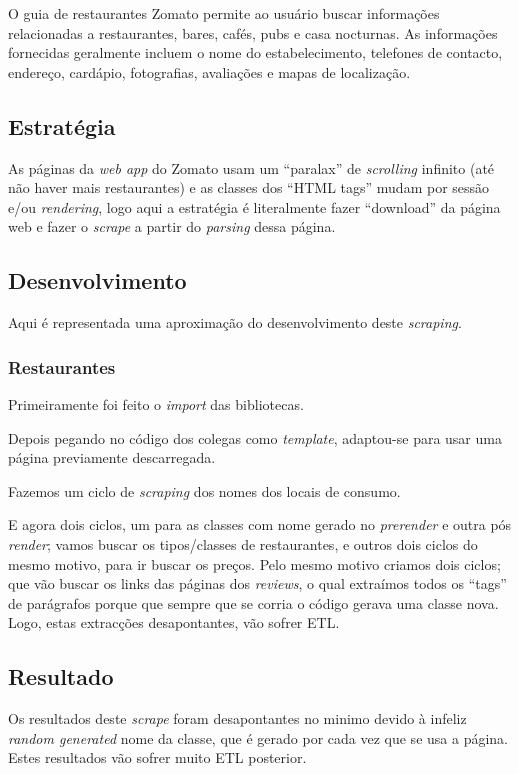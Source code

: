 O guia de restaurantes Zomato permite ao usuário buscar informações relacionadas a restaurantes, bares, cafés, pubs e casa nocturnas. As informações fornecidas geralmente incluem o nome do estabelecimento, telefones de contacto, endereço, cardápio, fotografias, avaliações e mapas de localização.

\subsection{Estratégia}
As páginas da \textit{web app} do Zomato usam um ``paralax'' de \textit{scrolling} infinito (até não haver mais restaurantes) e as classes dos ``HTML tags'' mudam por sessão e/ou \textit{rendering}, logo aqui a estratégia é literalmente fazer ``download'' da página web e fazer o \textit{scrape} a partir do \textit{parsing} dessa página.

\subsection{Desenvolvimento}
Aqui é representada uma aproximação do desenvolvimento deste \textit{scraping}.
\subsubsection{Restaurantes}
Primeiramente foi feito o \textit{import} das bibliotecas.

Depois pegando no código dos colegas como \textit{template}, adaptou-se para usar uma página previamente descarregada.

Fazemos um ciclo de \textit{scraping} dos nomes dos locais de consumo.

E agora dois ciclos, um para as classes com nome gerado no \textit{prerender} e outra pós \textit{render}; vamos buscar os tipos/classes de restaurantes, e outros dois ciclos do mesmo motivo, para ir buscar os preços. Pelo mesmo motivo criamos dois ciclos; que vão buscar os links das páginas dos \textit{reviews}, o qual extraímos todos os ``tags'' de parágrafos porque que sempre que se corria o código gerava uma classe nova.
Logo, estas extracções desapontantes, vão sofrer ETL.

\subsection{Resultado}
Os resultados deste \textit{scrape} foram desapontantes no minimo devido à infeliz \textit{random generated} nome da classe, que é gerado por cada vez que se usa a página. Estes resultados vão sofrer muito ETL posterior.

